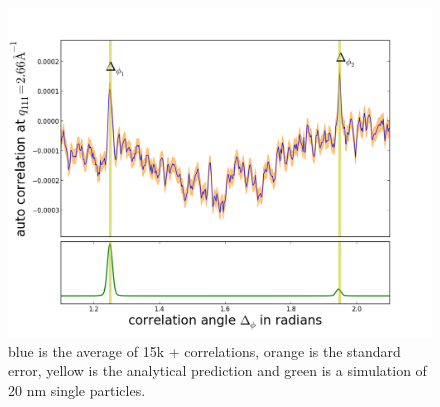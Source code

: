 \documentclass[a4paper,12pt]{article}
\begin{document}
\begin{figure}
\centering
\includegraphics[scale=0.6]{./figure_COR.png}
	\caption[font=small]{ blue is the average of 15k + correlations, orange is the standard error, yellow is the analytical prediction and green is a simulation of 20 nm single particles.}
\label{COR}
\end{figure}
\end{document}
